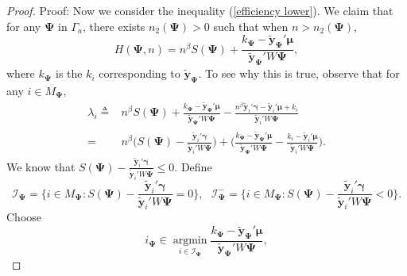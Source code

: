 \documentclass[final,11pt,3p]{article}\usepackage{setspace}
\begin{document}
\begin{proof}{Proof:}
Now we consider the inequality (\ref{efficiency lower}).
We claim that for any $\boldsymbol{\Psi}$ in $\Gamma_a$, there exists $n_2(\boldsymbol{\Psi}) > 0$ such that when $n > n_2(\boldsymbol{\Psi})$,
\begin{equation} \label{H}
H(\boldsymbol{\Psi}, n) = n^{\beta} S(\boldsymbol{\Psi})+ \frac{k_{\boldsymbol{\Psi}}- \tilde{\boldsymbol{y}}_{\boldsymbol{\Psi}}' \boldsymbol{\mu}}{ \tilde{\boldsymbol{y}}_{\boldsymbol{\Psi}}' W \boldsymbol{\Psi}},
\end{equation}
where $k_{\boldsymbol{\Psi}}$ is the $k_i$ corresponding to $\tilde{\boldsymbol{y}}_{\boldsymbol{\Psi}}$.
To see why this is true, observe that for any $i \in M_{\boldsymbol{\Psi}}$,
\begin{align*}
\lambda_i \triangleq  & n^{\beta} S(\boldsymbol{\Psi})+ \frac{k_{\boldsymbol{\Psi}}- \tilde{\boldsymbol{y}}_{\boldsymbol{\Psi}}' \boldsymbol{\mu}}{ \tilde{\boldsymbol{y}}_{\boldsymbol{\Psi}}' W \boldsymbol{\Psi}} -
\frac{n^{\beta} \tilde{\boldsymbol{y}}_i'\boldsymbol{\gamma} - \tilde{\boldsymbol{y}}_i'\boldsymbol{\mu}  + k_i}{ \tilde{\boldsymbol{y}}_i' W \boldsymbol{\Psi}} \\
=& n^{\beta} \big(S(\boldsymbol{\Psi})-\frac{ \tilde{\boldsymbol{y}}_i'\boldsymbol{\gamma} }{ \tilde{\boldsymbol{y}}_i' W \boldsymbol{\Psi}} ) +
(\frac{k_{\boldsymbol{\Psi}}- \tilde{\boldsymbol{y}}_{\boldsymbol{\Psi}}' \boldsymbol{\mu}}{ \tilde{\boldsymbol{y}}_{\boldsymbol{\Psi}}' W \boldsymbol{\Psi}} -
\frac{k_i- \tilde{\boldsymbol{y}}_i' \boldsymbol{\mu}}{ \tilde{\boldsymbol{y}}_i' W \boldsymbol{\Psi}}\big).
\end{align*}
We know that $S(\boldsymbol{\Psi})-\frac{ \tilde{\boldsymbol{y}}_i'\boldsymbol{\gamma} }{ \tilde{\boldsymbol{y}}_i' W \boldsymbol{\Psi}} \le 0$. Define
\begin{equation*}
\mathcal{I}_{\boldsymbol{\Psi}} = \{i \in M_{\boldsymbol{\Psi}}: S(\boldsymbol{\Psi})-\frac{ \tilde{\boldsymbol{y}}_i'\boldsymbol{\gamma} }{ \tilde{\boldsymbol{y}}_i' W \boldsymbol{\Psi}} = 0 \},~~~
\mathcal{I}_{\boldsymbol{\Psi}}^- = \{i \in M_{\boldsymbol{\Psi}}: S(\boldsymbol{\Psi})-\frac{ \tilde{\boldsymbol{y}}_i'\boldsymbol{\gamma} }{ \tilde{\boldsymbol{y}}_i' W \boldsymbol{\Psi}} < 0 \}.
\end{equation*}
Choose
\begin{equation*}
i_{\boldsymbol{\Psi}} \in \mathop{\arg\min} \limits_{i \in \mathcal{I}_{\boldsymbol{\Psi}}} \frac{k_{\boldsymbol{\Psi}}- \tilde{\boldsymbol{y}}_{\boldsymbol{\Psi}}' \boldsymbol{\mu}}{ \tilde{\boldsymbol{y}}_{\boldsymbol{\Psi}}' W \boldsymbol{\Psi}},

\end{equation*}
\end{proof}
\end{document}
